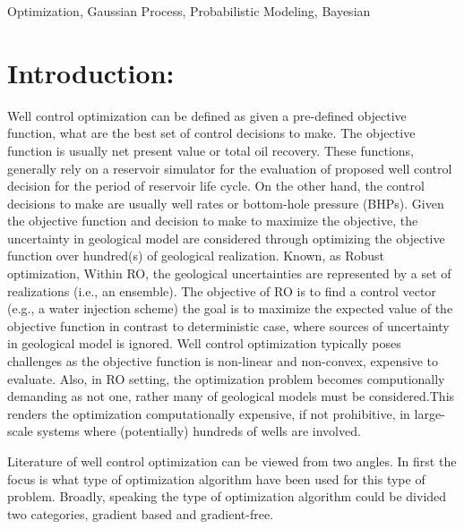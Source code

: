 \documentclass[]{elsarticle} %
\begin{document}
\begin{frontmatter}
\begin{abstract}
  \end{abstract}
   \begin{keyword} Optimization, Gaussian Process, Probabilistic Modeling, Bayesian\end{keyword}
 \end{frontmatter}

\newpage

\hypertarget{introduction}{%
\section{Introduction:}\label{introduction}}

\doublespacing

Well control optimization can be defined as given a pre-defined objective function, what are the best set of control decisions to make. The objective function is usually net present value or total oil recovery. These functions, generally rely on a reservoir simulator for the evaluation of proposed well control decision for the period of reservoir life cycle. On the other hand, the control decisions to make are usually well rates or bottom-hole pressure (BHPs). Given the objective function and decision to make to maximize the objective, the uncertainty in geological model are considered through optimizing the objective function over hundred(s) of geological realization. Known, as Robust optimization, Within RO, the geological uncertainties are represented by a set of realizations (i.e., an ensemble). The objective of RO is to find a control vector (e.g., a water injection scheme) the goal is to maximize the expected value of the objective function in contrast to deterministic case, where sources of uncertainty in geological model is ignored. Well control optimization typically poses challenges as the objective function is non-linear and non-convex, expensive to evaluate. Also, in RO setting, the optimization problem becomes computionally demanding as not one, rather many of geological models must be considered.This renders the optimization computationally expensive, if not prohibitive, in large-scale systems where (potentially) hundreds of wells are involved.

Literature of well control optimization can be viewed from two angles. In first the focus is what type of optimization algorithm have been used for this type of problem. Broadly, speaking the type of optimization algorithm could be divided two categories, gradient based and gradient-free.
\end{document}
